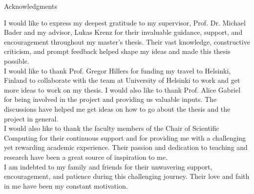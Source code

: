 \thispagestyle{empty}

\vspace*{20mm}

\begin{center}
    { Acknowledgments}
\end{center}

\vspace{10mm}

I would like to express my deepest gratitude to my supervisor, Prof. Dr. Michael Bader and my advisor, Lukas Krenz 
for their invaluable guidance, support, and encouragement throughout my master's thesis. 
Their vast knowledge, constructive criticism, and prompt feedback helped shape my ideas and made this thesis possible. \\

I would like to thank Prof. Gregor Hillers for funding my travel to Helsinki, Finland to collaborate with the team at University of Helsinki
to work and get more ideas to work on my thesis. I would also like to thank Prof. Alice Gabriel for being involved in the project and providing us valuable inputs.
The discussions have helped me get ideas on how to go about the thesis and the project in general.\\

I would also like to thank the faculty members of the Chair of Scientific Computing for their continuous support and for providing 
me with a challenging yet rewarding academic experience. Their passion and dedication to teaching and research have been a 
great source of inspiration to me. \\

I am indebted to my family and friends for their unwavering support, encouragement, and patience during this challenging 
journey. Their love and faith in me have been my constant motivation. \\

\cleardoublepage{}
